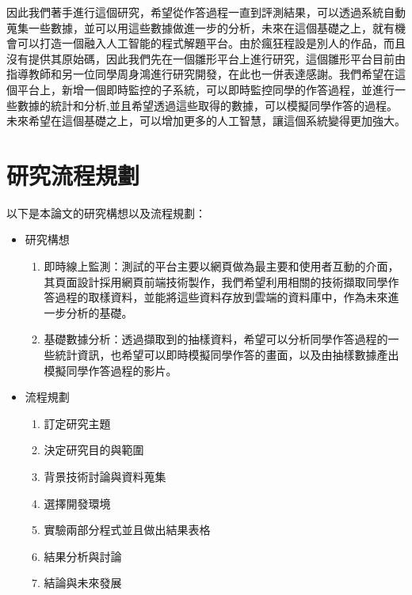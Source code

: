 因此我們著手進行這個研究，希望從作答過程一直到評測結果，可以透過系統自動蒐集一些數據，並可以用這些數據做進一步的分析，未來在這個基礎之上，就有機會可以打造一個融入人工智能的程式解題平台。由於瘋狂程設是別人的作品，而且沒有提供其原始碼，因此我們先在一個雛形平台上進行研究，這個雛形平台目前由指導教師和另一位同學周身鴻進行研究開發，在此也一併表達感謝。我們希望在這個平台上，新增一個即時監控的子系統，可以即時監控同學的作答過程，並進行一些數據的統計和分析,並且希望透過這些取得的數據，可以模擬同學作答的過程。未來希望在這個基礎之上，可以增加更多的人工智慧，讓這個系統變得更加強大。

\section{研究流程規劃}

以下是本論文的研究構想以及流程規劃：

\begin{itemize}%
	\item 研究構想
		\begin{enumerate}[1.]%
			\item 即時線上監測：測試的平台主要以網頁做為最主要和使用者互動的介面，其頁面設計採用網頁前端技術製作，我們希望利用相關的技術擷取同學作答過程的取樣資料，並能將這些資料存放到雲端的資料庫中，作為未來進一步分析的基礎。
			\item 基礎數據分析：透過擷取到的抽樣資料，希望可以分析同學作答過程的一些統計資訊，也希望可以即時模擬同學作答的畫面，以及由抽樣數據產出模擬同學作答過程的影片。
		\end{enumerate}

	\item 流程規劃
		\begin{enumerate}[1.]
			\item 訂定研究主題
			\item 決定研究目的與範圍
			\item 背景技術討論與資料蒐集
			\item 選擇開發環境
			\item 實驗兩部分程式並且做出結果表格
			\item 結果分析與討論
			\item 結論與未來發展
		\end{enumerate}
\end{itemize}
\newpage
